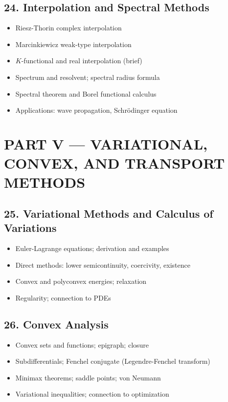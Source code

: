 \subsection{24. Interpolation and Spectral Methods}
\begin{itemize}
\item Riesz-Thorin complex interpolation
\item Marcinkiewicz weak-type interpolation
\item $K$-functional and real interpolation (brief)
\item Spectrum and resolvent; spectral radius formula
\item Spectral theorem and Borel functional calculus
\item Applications: wave propagation, Schr\"odinger equation
\end{itemize}

\section{PART V --- VARIATIONAL, CONVEX, AND TRANSPORT METHODS}

\subsection{25. Variational Methods and Calculus of Variations}
\begin{itemize}
\item Euler-Lagrange equations; derivation and examples
\item Direct methods: lower semicontinuity, coercivity, existence
\item Convex and polyconvex energies; relaxation
\item Regularity; connection to PDEs
\end{itemize}

\subsection{26. Convex Analysis}
\begin{itemize}
\item Convex sets and functions; epigraph; closure
\item Subdifferentials; Fenchel conjugate (Legendre-Fenchel transform)
\item Minimax theorems; saddle points; von Neumann
\item Variational inequalities; connection to optimization
\end{itemize}

